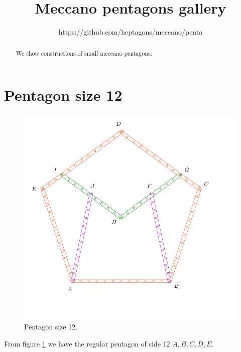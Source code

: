 \documentclass[11pt]{article}
\title{Meccano pentagons gallery}
\author{https://github.com/heptagons/meccano/penta}
\date{}
\begin{document}
\maketitle
\begin{abstract}
We show constructions of small meccano pentagons.
\end{abstract}

\section{Pentagon size 12}

\begin{figure}[htp]
 \centering
 \includegraphics[scale=0.75]{gallery/penta12a}
 \caption{Pentagon size 12.}
 \label{fig:penta12a}
\end{figure}

From figure \ref{fig:penta12a} we have the regular pentagon of side 12 $A,B,C,D,E$.
\end{document}
